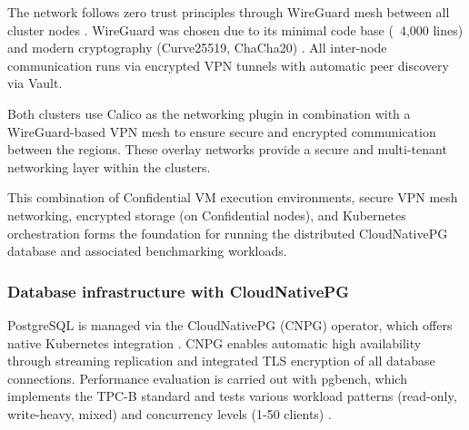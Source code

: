The network follows zero trust principles through WireGuard mesh between all cluster nodes \parencite{nist_zero_trust_2020}. WireGuard was chosen due to its minimal code base (~4,000 lines) and modern cryptography (Curve25519, ChaCha20) \parencite{donenfeld_wireguard_2017, wireguard_protocol_2024}. All inter-node communication runs via encrypted VPN tunnels with automatic peer discovery via Vault.

Both clusters use Calico as the networking plugin in combination with a WireGuard-based VPN mesh to ensure secure and encrypted communication between the regions. These overlay networks provide a secure and multi-tenant networking layer within the clusters.

This combination of Confidential VM execution environments, secure VPN mesh networking, encrypted storage (on Confidential nodes), and Kubernetes orchestration forms the foundation for running the distributed CloudNativePG database and associated benchmarking workloads.

\subsubsection{Database infrastructure with CloudNativePG}

PostgreSQL is managed via the CloudNativePG (CNPG) operator, which offers native Kubernetes integration \parencite{cnpg_docs_2025}. CNPG enables automatic high availability through streaming replication and integrated TLS encryption of all database connections. Performance evaluation is carried out with pgbench, which implements the TPC-B standard and tests various workload patterns (read-only, write-heavy, mixed) and concurrency levels (1-50 clients) \parencite{pgbench_docs_2024, tpc_b_2024, postgresql_17_2024}.
